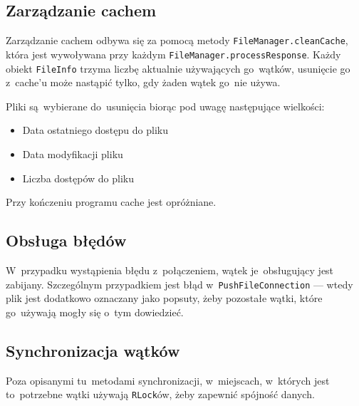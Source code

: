 \documentclass[a4paper,notitlepage]{article}
\begin{document}
\subsection{Zarządzanie cachem}
Zarządzanie cachem odbywa się za pomocą metody \texttt{FileManager.cleanCache},
która jest wywoływana przy każdym \texttt{FileManager.processResponse}.
Każdy obiekt \texttt{FileInfo} trzyma liczbę aktualnie używających go~wątków,
usunięcie go z~cache'u może nastąpić tylko, gdy żaden wątek go~nie używa.

Pliki są~wybierane do~usunięcia biorąc pod uwagę następujące wielkości:
\begin{itemize}
\item Data ostatniego dostępu do pliku
\item Data modyfikacji pliku
\item Liczba dostępów do pliku
\end{itemize}

Przy kończeniu programu cache jest opróżniane.

\subsection{Obsługa błędów}
W~przypadku wystąpienia błędu z~połączeniem, wątek je~obsługujący jest
zabijany. Szczególnym przypadkiem jest błąd w~\texttt{PushFileConnection}
--- wtedy plik jest dodatkowo oznaczany jako popsuty, żeby pozostałe 
wątki, które go~używają mogły się o~tym dowiedzieć.

\subsection{Synchronizacja wątków}
Poza opisanymi tu~metodami synchronizacji, w~miejscach, w~których jest 
to~potrzebne wątki używają \texttt{RLock}ów, żeby zapewnić spójność
danych.
\end{document}
